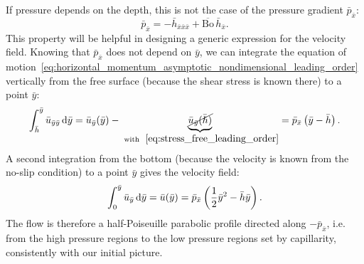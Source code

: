 If pressure depends on the depth, this is not the case of the pressure gradient $\bar p_{\bar x}$:
\begin{equation}
\bar p_{\bar x} = -\bar h_{\bar x \bar x \bar x} + \overline{\text{Bo}} \, \bar h_{\bar x}.
\end{equation}
This property will be helpful in designing a generic expression for the velocity field.
 Knowing that $\bar p_{\bar x}$ does not depend on $\bar y$, we can integrate the equation of motion~\eqref{eq:horizontal_momentum_asymptotic_nondimensional_leading_order} vertically from the free surface (because the shear stress is known there) to a point $\bar y$:
\begin{equation}
\int_{\bar h}^{\bar y} \bar u_{\bar y \bar y}\, \mathrm d\bar y = \bar u_{\bar y}(\bar y) - \underbrace{\cancel{\bar u_{\bar y}(\bar h)}}_{\text{ with }~\eqref{eq:stress_free_leading_order}} = \bar p_{\bar x}\left(\bar y - \bar h\right).
\end{equation}
A second integration from the bottom (because the velocity is known from the no-slip condition) to a point $\bar y$ gives the velocity field:
\begin{equation}
\int_{0}^{\bar y} \bar u_{\bar y}\, \mathrm d\bar y = \bar u(\bar y) = \bar p_{\bar x}\left(\frac{1}{2}\bar y^2 - \bar h\bar y\right).
\label{eq:velocity_field_film}
\end{equation}
The flow is therefore a half-Poiseuille parabolic profile directed along $-\bar p_{\bar x}$, i.e. from the high pressure regions to the low pressure regions set by capillarity, consistently with our initial picture.
